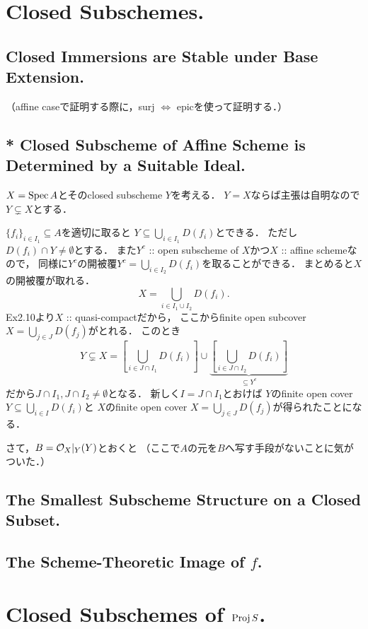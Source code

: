 \documentclass[a4paper]{jsarticle}
\begin{document}
\section{Closed Subschemes.} %
\subsection{Closed Immersions are Stable under Base Extension.}
    （affine caseで証明する際に，surj $\iff$ epicを使って証明する．）

\subsection{* Closed Subscheme of Affine Scheme is Determined by a Suitable Ideal.}
    $X=\operatorname{Spec} A$とそのclosed subscheme $Y$を考える．
    $Y=X$ならば主張は自明なので$Y \subsetneq X$とする．

    $\{f_i\}_{i \in I_1} \subseteq A$を適切に取ると
    $Y \subseteq \bigcup_{i \in I_1} D(f_i)$とできる．
    ただし$D(f_i) \cap Y \neq \emptyset$とする．
    また$Y^c$ :: open subscheme of $X$かつ$X$ :: affine schemeなので，
    同様に$Y^c$の開被覆$Y^c=\bigcup_{i \in I_2} D(f_i)$を取ることができる．
    まとめると$X$の開被覆が取れる．
    \[ X=\bigcup_{i \in I_1 \cup I_2} D(f_i). \]
    Ex2.10より$X$ :: quasi-compactだから，
    ここからfinite open subcover$X=\bigcup_{j \in J} D(f_j)$がとれる．
    このとき
    \[
        Y \subsetneq X=
        \left[\bigcup_{i \in J \cap I_1} D(f_i)\right]
        \cup
        \underbrace{\left[\bigcup_{i \in J \cap I_2} D(f_i)\right]}_{\subseteq Y^c}
    \]
    だから$J \cap I_1, J \cap I_2 \neq \emptyset$となる．
    新しく$I=J \cap I_1$とおけば
    $Y$のfinite open cover $Y \subseteq \bigcup_{i \in I} D(f_i)$と
    $X$のfinite open cover $X=\bigcup_{j \in J} D(f_j)$が得られたことになる．

    さて，$B=\mathcal{O}_X|_Y(Y)$とおくと
    （ここで$A$の元を$B$へ写す手段がないことに気がついた．）

\subsection{The Smallest Subscheme Structure on a Closed Subset.}

\subsection{The Scheme-Theoretic Image of $f$.}

\section{Closed Subschemes of $\operatorname{Proj} S$.} %
\end{document}
